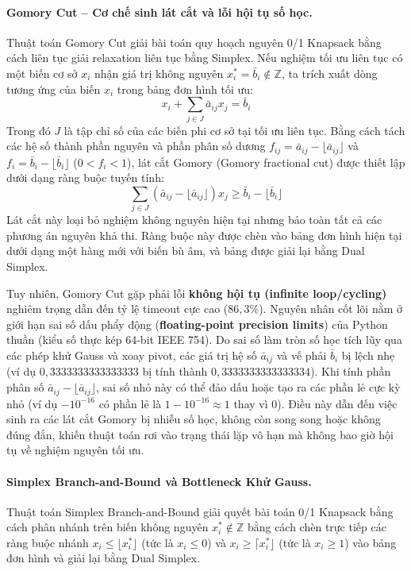 \documentclass[fontsize=13pt,a4paper]{report}
\begin{document}
\paragraph{Gomory Cut -- Cơ chế sinh lát cắt và lỗi hội tụ số học.}
Thuật toán Gomory Cut giải bài toán quy hoạch nguyên 0/1 Knapsack bằng cách liên tục giải relaxation liên tục bằng Simplex. Nếu nghiệm tối ưu liên tục có một biến cơ sở $x_i$ nhận giá trị không nguyên $x_i^* = \bar{b}_i \notin \mathbb{Z}$, ta trích xuất dòng tương ứng của biến $x_i$ trong bảng đơn hình tối ưu:
\begin{equation}
    x_i + \sum_{j \in J} \bar{a}_{ij} x_j = \bar{b}_i
\end{equation}
Trong đó $J$ là tập chỉ số của các biến phi cơ sở tại tối ưu liên tục. Bằng cách tách các hệ số thành phần nguyên và phần phân số dương $f_{ij} = \bar{a}_{ij} - \lfloor \bar{a}_{ij} \rfloor$ và $f_i = \bar{b}_i - \lfloor \bar{b}_i \rfloor$ ($0 < f_i < 1$), lát cắt Gomory (Gomory fractional cut) được thiết lập dưới dạng ràng buộc tuyến tính:
\begin{equation}
    \sum_{j \in J} (\bar{a}_{ij} - \lfloor \bar{a}_{ij} \rfloor) x_j \ge \bar{b}_i - \lfloor \bar{b}_i \rfloor
\end{equation}
Lát cắt này loại bỏ nghiệm không nguyên hiện tại nhưng bảo toàn tất cả các phương án nguyên khả thi. Ràng buộc này được chèn vào bảng đơn hình hiện tại dưới dạng một hàng mới với biến bù âm, và bảng được giải lại bằng Dual Simplex.

Tuy nhiên, Gomory Cut gặp phải lỗi \textbf{không hội tụ (infinite loop/cycling)} nghiêm trọng dẫn đến tỷ lệ timeout cực cao ($86,3\%$). Nguyên nhân cốt lõi nằm ở giới hạn sai số dấu phẩy động (\textbf{floating-point precision limits}) của Python thuần (kiểu số thực kép 64-bit IEEE 754). Do sai số làm tròn số học tích lũy qua các phép khử Gauss và xoay pivot, các giá trị hệ số $\bar{a}_{ij}$ và vế phải $\bar{b}_i$ bị lệch nhẹ (ví dụ $0,3333333333333333$ bị tính thành $0,3333333333333334$). Khi tính phần phân số $\bar{a}_{ij} - \lfloor \bar{a}_{ij} \rfloor$, sai số nhỏ này có thể đảo dấu hoặc tạo ra các phần lẻ cực kỳ nhỏ (ví dụ $-10^{-16}$ có phần lẻ là $1 - 10^{-16} \approx 1$ thay vì $0$). Điều này dẫn đến việc sinh ra các lát cắt Gomory bị nhiễu số học, không còn song song hoặc không đúng đắn, khiến thuật toán rơi vào trạng thái lặp vô hạn mà không bao giờ hội tụ về nghiệm nguyên tối ưu.

\paragraph{Simplex Branch-and-Bound và Bottleneck Khử Gauss.}
Thuật toán Simplex Branch-and-Bound giải quyết bài toán 0/1 Knapsack bằng cách phân nhánh trên biến không nguyên $x_i^* \notin \mathbb{Z}$ bằng cách chèn trực tiếp các ràng buộc nhánh $x_i \le \lfloor x_i^* \rfloor$ (tức là $x_i \le 0$) và $x_i \ge \lceil x_i^* \rfloor$ (tức là $x_i \ge 1$) vào bảng đơn hình và giải lại bằng Dual Simplex. 
\end{document}

